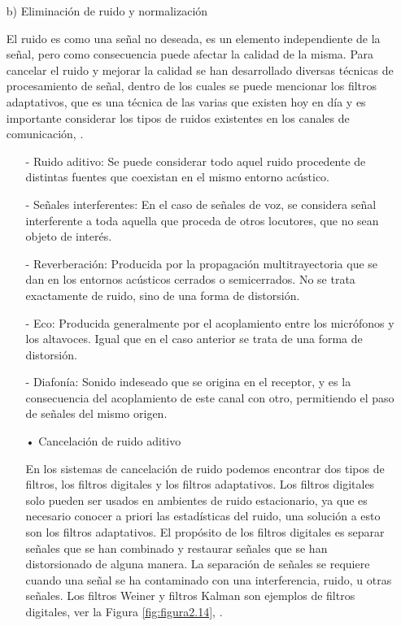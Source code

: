 \begin{enumerate}
\item[b)]Eliminación de ruido y normalización
\par
El ruido es como una señal no deseada, es un elemento independiente de la señal, pero como consecuencia puede afectar la calidad de la misma. Para cancelar el ruido y mejorar la calidad se han desarrollado diversas técnicas de procesamiento de señal, dentro de los cuales se puede mencionar los filtros adaptativos, que es una técnica de las varias que existen hoy en día y es importante considerar los tipos de ruidos existentes en los canales de comunicación, \cite{henry}.

\begin{enumerate}
\item[-]Ruido aditivo: Se puede considerar todo aquel ruido procedente de distintas fuentes que coexistan en el mismo entorno acústico.
\item[-]Señales interferentes: En el caso de señales de voz, se considera señal interferente a toda aquella que proceda de otros locutores, que no sean objeto de interés.
\item[-]Reverberación: Producida por la propagación multitrayectoria que se dan en los entornos acústicos cerrados o semicerrados. No se trata exactamente de ruido, sino de una forma de distorsión.
\item[-]Eco: Producida generalmente por el acoplamiento entre los micrófonos y los altavoces. Igual que en el caso anterior se trata de una forma de distorsión.
\item[-]Diafonía: Sonido indeseado que se origina en el receptor, y es la consecuencia del acoplamiento de este canal con otro, permitiendo el paso de señales del mismo origen.
\end{enumerate}

\begin{enumerate}
\item[•]Cancelación de ruido aditivo
\par
En los sistemas de cancelación de ruido podemos encontrar dos tipos de filtros, los filtros digitales y los filtros adaptativos. Los filtros digitales solo pueden ser usados en ambientes de ruido estacionario, ya que es necesario conocer a priori las estadísticas del ruido, una solución a esto son los filtros adaptativos.
\vskip 0.5cm
El propósito de los filtros digitales es separar señales que se han combinado y restaurar señales que se han distorsionado de alguna manera. La separación de señales se requiere cuando una señal se ha contaminado con una interferencia, ruido, u otras señales. Los filtros Weiner y filtros Kalman son ejemplos de filtros digitales, ver la Figura \ref{fig:figura2.14}, \cite{shubhra}.


\end{enumerate}
\end{enumerate}
